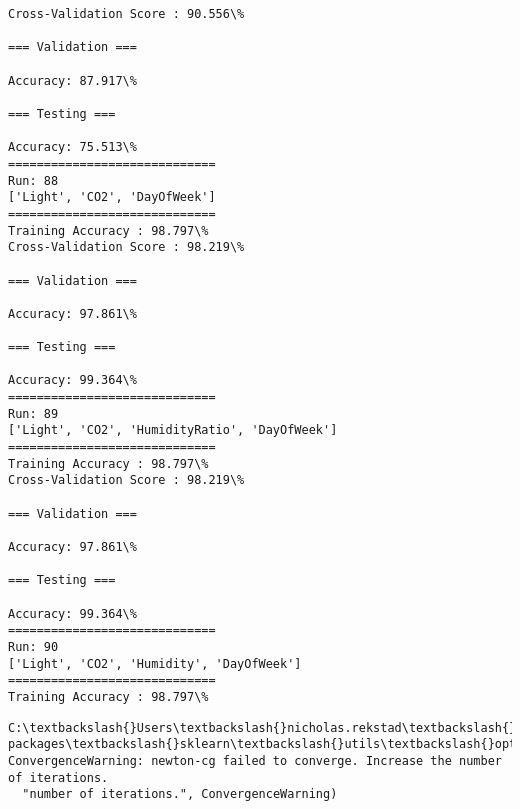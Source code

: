 \documentclass[11pt]{article}
\begin{document}
    \begin{Verbatim}[commandchars=\\\{\}]
Cross-Validation Score : 90.556\%

=== Validation ===

Accuracy: 87.917\%

=== Testing ===

Accuracy: 75.513\%
=============================
Run: 88
['Light', 'CO2', 'DayOfWeek']
=============================
Training Accuracy : 98.797\%
Cross-Validation Score : 98.219\%

=== Validation ===

Accuracy: 97.861\%

=== Testing ===

Accuracy: 99.364\%
=============================
Run: 89
['Light', 'CO2', 'HumidityRatio', 'DayOfWeek']
=============================
Training Accuracy : 98.797\%
Cross-Validation Score : 98.219\%

=== Validation ===

Accuracy: 97.861\%

=== Testing ===

Accuracy: 99.364\%
=============================
Run: 90
['Light', 'CO2', 'Humidity', 'DayOfWeek']
=============================
Training Accuracy : 98.797\%

    \end{Verbatim}

    \begin{Verbatim}[commandchars=\\\{\}]
C:\textbackslash{}Users\textbackslash{}nicholas.rekstad\textbackslash{}AppData\textbackslash{}Roaming\textbackslash{}Python\textbackslash{}Python36\textbackslash{}site-packages\textbackslash{}sklearn\textbackslash{}utils\textbackslash{}optimize.py:203: ConvergenceWarning: newton-cg failed to converge. Increase the number of iterations.
  "number of iterations.", ConvergenceWarning)

    \end{Verbatim}
\end{document}
